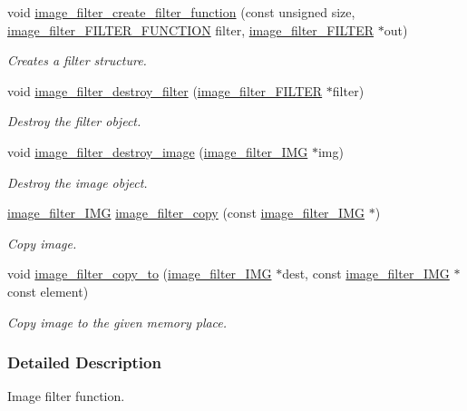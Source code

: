 \begin{DoxyCompactItemize}
void \hyperlink{a00012_a83e83866ae0fd0cee569b15800fc779e}{image\-\_\-filter\-\_\-create\-\_\-filter\-\_\-function} (const unsigned size, \hyperlink{a00012_acaed2c22ba7a7ae3c91fd6a6acb5b19a}{image\-\_\-filter\-\_\-\-F\-I\-L\-T\-E\-R\-\_\-\-F\-U\-N\-C\-T\-I\-O\-N} filter, \hyperlink{a00003}{image\-\_\-filter\-\_\-\-F\-I\-L\-T\-E\-R} $\ast$out)
\begin{DoxyCompactList}\small\item\em Creates a filter structure. \end{DoxyCompactList}\item 
void \hyperlink{a00012_a2e8e2ff324fd37f6f71d35ef6c2f0d26}{image\-\_\-filter\-\_\-destroy\-\_\-filter} (\hyperlink{a00003}{image\-\_\-filter\-\_\-\-F\-I\-L\-T\-E\-R} $\ast$filter)
\begin{DoxyCompactList}\small\item\em Destroy the filter object. \end{DoxyCompactList}\item 
void \hyperlink{a00012_aba9dc1def7d34f75e0f9dbd7029eeb9a}{image\-\_\-filter\-\_\-destroy\-\_\-image} (\hyperlink{a00004}{image\-\_\-filter\-\_\-\-I\-M\-G} $\ast$img)
\begin{DoxyCompactList}\small\item\em Destroy the image object. \end{DoxyCompactList}\item 
\hyperlink{a00004}{image\-\_\-filter\-\_\-\-I\-M\-G} \hyperlink{a00012_a69c4a25547866f04fdf558a03b8ffcdf}{image\-\_\-filter\-\_\-copy} (const \hyperlink{a00004}{image\-\_\-filter\-\_\-\-I\-M\-G} $\ast$)
\begin{DoxyCompactList}\small\item\em Copy image. \end{DoxyCompactList}\item 
void \hyperlink{a00012_a52b47e76b74ddefe45ecfd3efbc54a8b}{image\-\_\-filter\-\_\-copy\-\_\-to} (\hyperlink{a00004}{image\-\_\-filter\-\_\-\-I\-M\-G} $\ast$dest, const \hyperlink{a00004}{image\-\_\-filter\-\_\-\-I\-M\-G} $\ast$const element)
\begin{DoxyCompactList}\small\item\em Copy image to the given memory place. \end{DoxyCompactList}\end{DoxyCompactItemize}


\subsubsection{Detailed Description}
Image filter function. 


